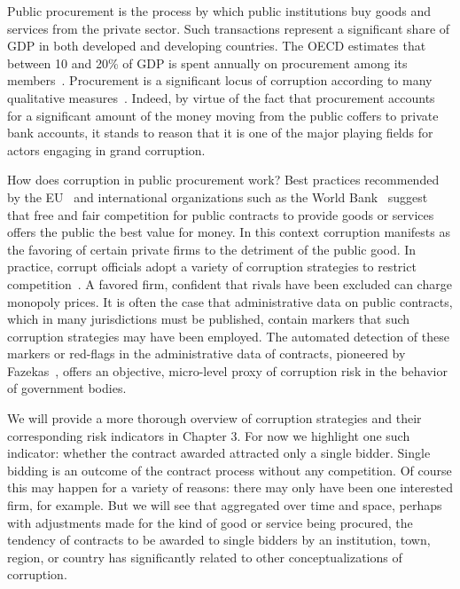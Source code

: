 Public procurement is the process by which public institutions buy goods and services from the private sector. Such transactions represent a significant share of GDP in both developed and developing countries. The OECD estimates that between 10 and 20\% of GDP is spent annually on procurement among its members~\cite{oecdprocurement}. Procurement is a significant locus of corruption according to many qualitative measures~\cite{integrity2007oecd}. Indeed, by virtue of the fact that procurement accounts for a significant amount of the money moving from the public coffers to private bank accounts, it stands to reason that it is one of the major playing fields for actors engaging in grand corruption.

How does corruption in public procurement work? Best practices recommended by the EU~\cite{euprocurement} and international organizations such as the World Bank~\cite{wbprocurement} suggest that free and fair competition for public contracts to provide goods or services offers the public the best value for money. In this context corruption manifests as the favoring of certain private firms to the detriment of the public good. In practice, corrupt officials adopt a variety of corruption strategies to restrict competition~\cite{fazekas2016objective}. A favored firm, confident that rivals have been excluded can charge monopoly prices. It is often the case that administrative data on public contracts, which in many jurisdictions must be published, contain markers that such corruption strategies may have been employed. The automated detection of these markers or red-flags in the administrative data of contracts, pioneered by Fazekas~\cite{fazekas2016objective,fazekas2017uncovering,fazekas2017corruption}, offers an objective, micro-level proxy of corruption risk in the behavior of government bodies.

We will provide a more thorough overview of corruption strategies and their corresponding risk indicators in Chapter 3. For now we highlight one such indicator: whether the contract awarded attracted only a single bidder. Single bidding is an outcome of the contract process without any competition. Of course this may happen for a variety of reasons: there may only have been one interested firm, for example. But we will see that aggregated over time and space, perhaps with adjustments made for the kind of good or service being procured, the tendency of contracts to be awarded to single bidders by an institution, town, region, or country has significantly related to other conceptualizations of corruption.


